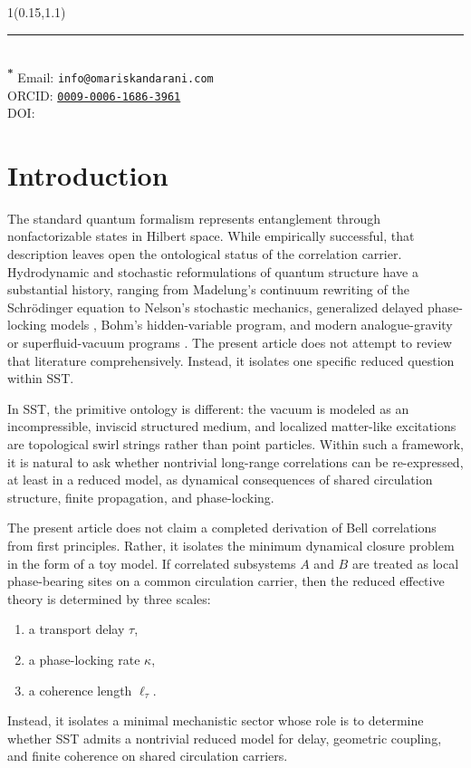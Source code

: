 \documentclass[11pt]{article}
\begin{document}
    
    \begin{textblock*}{1\textwidth}(0.15\textwidth,1.1\textheight)\raggedright\footnotesize\renewcommand{\arraystretch}{1.0} \noindent\rule{\textwidth}{0.4pt}\\[0.5em]
        \textsuperscript{\textbf{*}} Email: \texttt{info@omariskandarani.com}\\
        ORCID: \texttt{\href{https://orcid.org/0009-0006-1686-3961}{0009-0006-1686-3961}}\\
        DOI: \href{https://doi.org/\paperdoi}{\paperdoi}
    \end{textblock*}
    
    \newpage
    
    
    \section{Introduction}
        
        The standard quantum formalism represents entanglement through nonfactorizable states in Hilbert space. While empirically successful, that description leaves open the ontological status of the correlation carrier. Hydrodynamic and stochastic reformulations of quantum structure have a substantial history, ranging from Madelung's continuum rewriting of the Schrödinger equation to Nelson's stochastic mechanics, generalized delayed phase-locking models \cite{Yeung1999}, Bohm's hidden-variable program, and modern analogue-gravity or superfluid-vacuum programs \cite{Madelung1927,Nelson1966,Bohm1952,Barcelo2011,Volovik2003}. The present article does not attempt to review that literature comprehensively. Instead, it isolates one specific reduced question within SST.

        In SST, the primitive ontology is different: the vacuum is modeled as an incompressible, inviscid structured medium, and localized matter-like excitations are topological swirl strings rather than point particles. Within such a framework, it is natural to ask whether nontrivial long-range correlations can be re-expressed, at least in a reduced model, as dynamical consequences of shared circulation structure, finite propagation, and phase-locking.
        
        The present article does not claim a completed derivation of Bell correlations from first principles. Rather, it isolates the minimum dynamical closure problem in the form of a toy model. If correlated subsystems \(A\) and \(B\) are treated as local phase-bearing sites on a common circulation carrier, then the reduced effective theory is determined by three scales:
        \begin{enumerate}[label=(\roman*)]
    \item a transport delay \(\tau\),
    \item a phase-locking rate \(\kappa\),
    \item a coherence length \(\ell_\tau\).
        \end{enumerate}
        Instead, it isolates a minimal mechanistic sector whose role is to determine whether SST admits a nontrivial reduced model for delay, geometric coupling, and finite coherence on shared circulation carriers.
\end{document}
